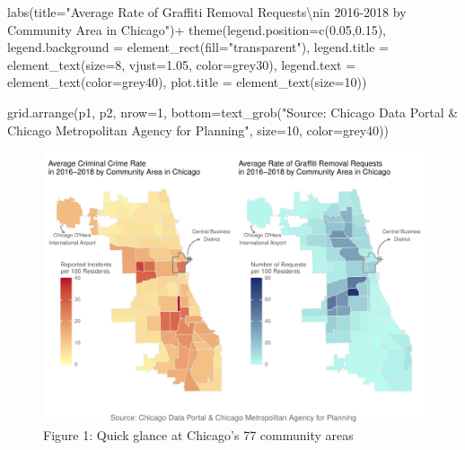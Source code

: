 \documentclass[
]{report}
\newenvironment{Shaded}{}{}
\newcommand{\AttributeTok}[1]{\textcolor[rgb]{0.65,0.15,0.64}{#1}}
\newcommand{\DecValTok}[1]{\textcolor[rgb]{0.60,0.41,0.00}{#1}}
\newcommand{\FloatTok}[1]{\textcolor[rgb]{0.60,0.41,0.00}{#1}}
\newcommand{\FunctionTok}[1]{\textcolor[rgb]{0.25,0.47,0.95}{#1}}
\newcommand{\NormalTok}[1]{\textcolor[rgb]{0.22,0.23,0.26}{#1}}
\newcommand{\SpecialCharTok}[1]{\textcolor[rgb]{0.00,0.52,0.74}{#1}}
\newcommand{\StringTok}[1]{\textcolor[rgb]{0.31,0.63,0.31}{#1}}
\begin{document}
\begin{Shaded}
\begin{Highlighting}[]
  \FunctionTok{labs}\NormalTok{(}\AttributeTok{title=}\StringTok{"Average Rate of Graffiti Removal Requests}\SpecialCharTok{\textbackslash{}n}\StringTok{in 2016{-}2018 by Community Area in Chicago"}\NormalTok{)}\SpecialCharTok{+}
  \FunctionTok{theme}\NormalTok{(}\AttributeTok{legend.position=}\FunctionTok{c}\NormalTok{(}\FloatTok{0.05}\NormalTok{,}\FloatTok{0.15}\NormalTok{), }
        \AttributeTok{legend.background =} \FunctionTok{element\_rect}\NormalTok{(}\AttributeTok{fill=}\StringTok{"transparent"}\NormalTok{),}
        \AttributeTok{legend.title =} \FunctionTok{element\_text}\NormalTok{(}\AttributeTok{size=}\DecValTok{8}\NormalTok{, }\AttributeTok{vjust=}\FloatTok{1.05}\NormalTok{, }\AttributeTok{color=}\StringTok{\textquotesingle{}grey30\textquotesingle{}}\NormalTok{),}
        \AttributeTok{legend.text =} \FunctionTok{element\_text}\NormalTok{(}\AttributeTok{color=}\StringTok{\textquotesingle{}grey40\textquotesingle{}}\NormalTok{),}
        \AttributeTok{plot.title =} \FunctionTok{element\_text}\NormalTok{(}\AttributeTok{size=}\DecValTok{10}\NormalTok{))}


\FunctionTok{grid.arrange}\NormalTok{(p1, p2, }\AttributeTok{nrow=}\DecValTok{1}\NormalTok{,}
             \AttributeTok{bottom=}\FunctionTok{text\_grob}\NormalTok{(}\StringTok{"Source: Chicago Data Portal \& Chicago Metropolitan Agency for Planning"}\NormalTok{, }\AttributeTok{size=}\DecValTok{10}\NormalTok{, }\AttributeTok{color=}\StringTok{\textquotesingle{}grey40\textquotesingle{}}\NormalTok{))}
\end{Highlighting}
\end{Shaded}

\begin{figure}[H]

\caption{Figure 1: Quick glance at Chicago's 77 community areas}

{\centering \includegraphics{final_solo_files/figure-pdf/unnamed-chunk-2-1.pdf}

}

\end{figure}
\end{document}
